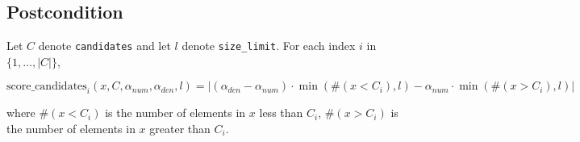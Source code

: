 \documentclass{article}
\begin{document}
\subsection*{Postcondition}

\begin{theorem}
    Let $C$ denote \texttt{candidates} and let $l$ denote \texttt{size\_limit}.
    For each index $i$ in $\{1, \ldots, |C|\}$,

    \begin{equation*}
        \mathrm{score\_candidates}_i(x, C, \alpha_{num}, \alpha_{den}, l) = |(\alpha_{den}-\alpha_{num}) \cdot \min(\#(x < C_i), l) - \alpha_{num} \cdot \min(\#(x > C_i), l)|
    \end{equation*}

    where $\#(x < C_i)$ is the number of elements in $x$ less than $C_i$,
    $\#(x > C_i)$ is the number of elements in $x$ greater than $C_i$.
\end{theorem}
\end{document}
